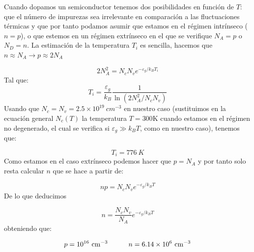 \begin{solucion}
	Cuando dopamos un semiconductor tenemos dos posibilidades en función de $T$: que el número de impurezas sea irrelevante en comparación a las fluctuaciones térmicas y que por tanto podamos asumir que estamos en el régimen intrínseco ($n=p$), o que estemos en un régimen extrínseco en el que se verifique $N_A=p$ o $N_D=n$. La estimación de la temperatura $T_i$ es sencilla, hacemos que $n\approx N_A \rightarrow p \approx 2N_A$
	
	\begin{equation*}
		2N_A^2 = N_c N_v e^{-\varepsilon_g / k_B T_i}
	\end{equation*}
	Tal que:
	\begin{equation*}
		T_i = \frac{\varepsilon_g}{k_B} \frac{1}{\ln (2N_A^2 / N_c N_v)}
	\end{equation*}
	Usando que $N_c = N_v = 2.5 \times 10^{19} \ \unit{cm^{-3}}$ en nuestro caso (sustituimos en la ecuación general $N_c(T)$ la temperatura $T=300$K cuando estamos en el régimen no degenerado, el cual se verifica si $\varepsilon_g \gg k_B T$, como en nuestro caso), tenemos que:
	
	\begin{equation*}
		T_i = 776 \ \unit{K}
	\end{equation*}
	Como estamos en el caso extrínseco podemos hacer que $p=N_A$ y por tanto solo resta calcular $n$ que se hace a partir de:
	
	\begin{equation*}
		n p = N_c N_v e^{-\varepsilon_g / k_B T}
	\end{equation*}
	De lo que deducimos 
	
	\begin{equation*}
		n  =  \frac{N_c N_v}{N_A} e^{-\varepsilon_g / k_B T}
	\end{equation*}
	obteniendo que:
	
	\begin{equation*}
		p = 10^{16} \ \unit{cm^{-3}} \tquad n = 6.14 \times 10^6 \ \unit{cm^{-3}}
	\end{equation*}
	
\end{solucion}	


\newpage


